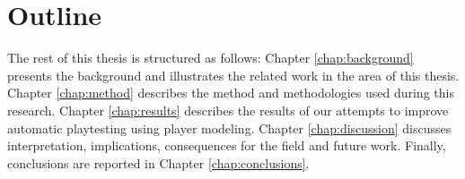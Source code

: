 \section{Outline}
The rest of this thesis is structured as follows:
Chapter \ref{chap:background} presents the background and illustrates the related work in the area of this thesis. Chapter \ref{chap:method} describes the method and methodologies used during this research. Chapter \ref{chap:results} describes the results of our attempts to improve automatic playtesting using player modeling. Chapter \ref{chap:discussion} discusses interpretation, implications, consequences for the field and future work. Finally, conclusions are reported in Chapter \ref{chap:conclusions}.
